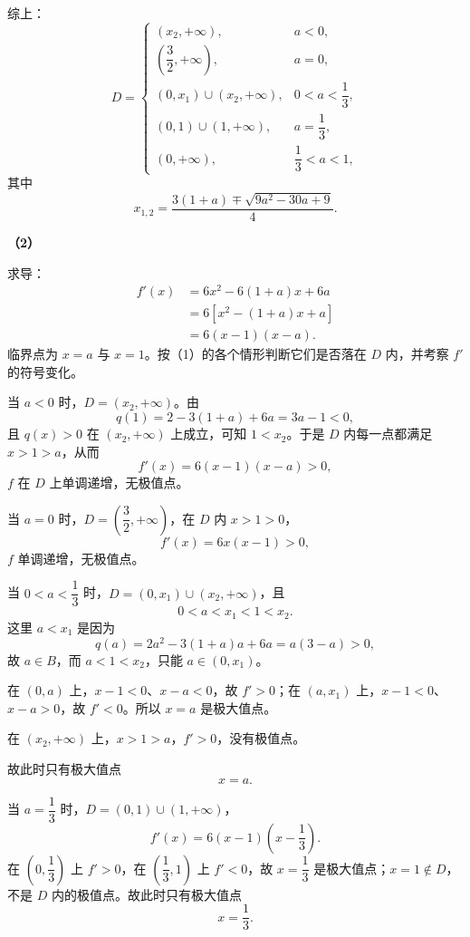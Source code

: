 \begin{answer}
综上：
\nopagebreak[4]
\[D=\begin{cases}
(x_2,+\infty), & a<0,\\[1mm]
\left(\dfrac32,+\infty\right), & a=0,\\[2mm]
(0,x_1)\cup(x_2,+\infty), & 0<a<\dfrac13,\\[1mm]
(0,1)\cup(1,+\infty), & a=\dfrac13,\\[1mm]
(0,+\infty), & \dfrac13<a<1,
\end{cases}\]
其中
\nopagebreak[4]
\[x_{1,2}=\frac{3(1+a)\mp\sqrt{9a^2-30a+9}}4.\]

\textbf{（2）}

求导：
\nopagebreak[4]
\[\begin{aligned}
f'(x)&=6x^2-6(1+a)x+6a\\
&=6\left[x^2-(1+a)x+a\right]\\
&=6(x-1)(x-a).
\end{aligned}\]
临界点为 $x=a$ 与 $x=1$。按（1）的各个情形判断它们是否落在 $D$ 内，并考察 $f'$ 的符号变化。

当 $a<0$ 时，$D=(x_2,+\infty)$。由
\nopagebreak[4]
\[q(1)=2-3(1+a)+6a=3a-1<0,\]
且 $q(x)>0$ 在 $(x_2,+\infty)$ 上成立，可知 $1<x_2$。于是 $D$ 内每一点都满足 $x>1>a$，从而
\nopagebreak[4]
\[f'(x)=6(x-1)(x-a)>0,\]
$f$ 在 $D$ 上单调递增，无极值点。

当 $a=0$ 时，$D=\left(\dfrac32,+\infty\right)$，在 $D$ 内 $x>1>0$，
\nopagebreak[4]
\[f'(x)=6x(x-1)>0,\]
$f$ 单调递增，无极值点。

当 $0<a<\dfrac13$ 时，$D=(0,x_1)\cup(x_2,+\infty)$，且
\nopagebreak[4]
\[0<a<x_1<1<x_2.\]
这里 $a<x_1$ 是因为
\nopagebreak[4]
\[q(a)=2a^2-3(1+a)a+6a=a(3-a)>0,\]
故 $a\in B$，而 $a<1<x_2$，只能 $a\in(0,x_1)$。

在 $(0,a)$ 上，$x-1<0$、$x-a<0$，故 $f'>0$；在 $(a,x_1)$ 上，$x-1<0$、$x-a>0$，故 $f'<0$。所以 $x=a$ 是极大值点。

在 $(x_2,+\infty)$ 上，$x>1>a$，$f'>0$，没有极值点。

故此时只有极大值点
\nopagebreak[4]
\[x=a.\]

当 $a=\dfrac13$ 时，$D=(0,1)\cup(1,+\infty)$，
\nopagebreak[4]
\[f'(x)=6(x-1)\left(x-\frac13\right).\]
在 $\left(0,\dfrac13\right)$ 上 $f'>0$，在 $\left(\dfrac13,1\right)$ 上 $f'<0$，故 $x=\dfrac13$ 是极大值点；$x=1\notin D$，不是 $D$ 内的极值点。故此时只有极大值点
\nopagebreak[4]
\[x=\frac13.\]


\end{answer}
